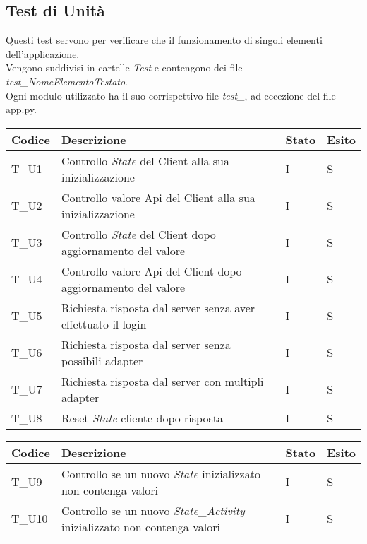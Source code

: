\subsection{Test di Unità}
Questi test servono per verificare che il funzionamento di singoli elementi dell'applicazione.  \\
Vengono suddivisi in cartelle \textit{Test} e contengono dei file \textit{test\_NomeElementoTestato}. \\
Ogni modulo utilizzato ha il suo corrispettivo file \textit{test\_}, ad eccezione del file app.py.
\begin{center}
  \renewcommand{\arraystretch}{1.8}
  \begin{tabular}{ |m{3em}|m{23em}|m{3em}|m{3em}| }
      \hline
      \textbf{Codice} & \textbf{Descrizione}  & \textbf{Stato} & \textbf{Esito}\\
      \hline
      T\_U1 & Controllo \textit{State} del Client alla sua inizializzazione & I & S \\
      \hline
      T\_U2 & Controllo valore Api del Client alla sua inizializzazione & I & S \\
      \hline
      T\_U3 & Controllo \textit{State} del Client dopo aggiornamento del valore & I & S \\
      \hline
      T\_U4 & Controllo valore Api del Client dopo aggiornamento del valore & I & S \\
      \hline
      T\_U5 & Richiesta risposta dal server senza aver effettuato il login & I & S \\
      \hline
      T\_U6 & Richiesta risposta dal server senza possibili adapter & I & S \\
      \hline
      T\_U7 & Richiesta risposta dal server con multipli adapter & I & S \\
      \hline
      T\_U8 & Reset \textit{State} cliente dopo risposta & I & S \\
      \hline
  \end{tabular}
  \newpage
  \begin{tabular}{ |m{3em}|m{23em}|m{3em}|m{3em}| }
    \hline
    \textbf{Codice} & \textbf{Descrizione}  & \textbf{Stato} & \textbf{Esito}\\
    \hline
      T\_U9 & Controllo se un nuovo \textit{State} inizializzato non contenga valori  & I & S \\
      \hline
      T\_U10 & Controllo se un nuovo \textit{State\_Activity} inizializzato non contenga valori  & I & S\\
      \hline

\end{tabular}
\end{center}
